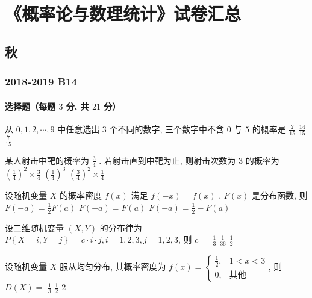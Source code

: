 \chapter{《概率论与数理统计》试卷汇总}

\section{秋}
\subsection{2018-2019 B14}
\subsubsection{选择题（每题 $3$ 分, 共 $21$ 分）}
\begin{ti}
	从 $0,1,2,\cdots,9$ 中任意选出 $3$ 个不同的数字, 三个数字中不含 $0$ 与 $5$ 的概率是 \kuo{}
	{$\frac{2}{15}$}
	{$\frac{14}{15}$}
	{$\frac{7}{15}$}
\end{ti}

\begin{ti}
	某人射击中靶的概率为 $\frac{3}{4}$ . 若射击直到中靶为止, 则射击次数为 $3$ 的概率为 \kuo{}
	{$\left(\frac{1}{4}\right)^2\times\frac{3}{4}$}
	{$\left(\frac{1}{4}\right)^3$}
	{$\left(\frac{3}{4}\right)^2\times\frac{1}{4}$}
\end{ti}

\begin{ti}
	设随机变量 $X$ 的概率密度 $f(x)$ 满足 $f(-x)=f(x)$ , $F(x)$ 是分布函数, 则 \kuo{}
	{$F(-a)=\frac{1}{2}F(a)$}
	{$F(-a)=F(a)$}
	{$F(-a)=\frac{1}{2}-F(a)$}
\end{ti}

\begin{ti}
	设二维随机变量 $(X,Y)$ 的分布律为 $P\left\{X=i,Y=j\right\}=c\cdot i\cdot j,i=1,2,3,j=1,2,3$, 则 $c=$ \kuo{}
	{$\frac{1}{3}$}
	{$\frac{1}{36}$}
	{$\frac{1}{2}$}
\end{ti}

\begin{ti}
	设随机变量 $X$ 服从均匀分布, 其概率密度为 $f(x)=
	\begin{cases}
	\frac{1}{2}, & 1<x<3\\
	0, & \text{其他}
	\end{cases}
	$, 则 $D(X)=$ \kuo{}
	{$\frac{1}{3}$}
	{$\frac{1}{2}$}
	{$2$}
\end{ti}


